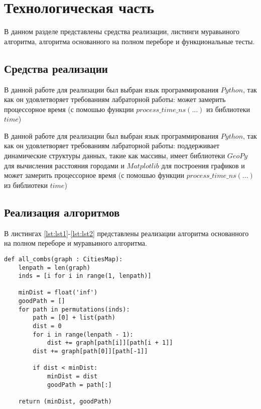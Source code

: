 \chapter{Технологическая часть}

В данном разделе представлены средства реализации, листинги муравьиного алгоритма, алгоритма основанного на полном переборе и функциональные тесты.

\section{Средства реализации}
В данной работе для реализации был выбран язык программирования $Python$\cite{python-city}, так как он удовлетворяет требованиям лабраторной работы: может замерить процессорное время (с помошью функции $process\_time\_ns(...)$ из библиотеки $time$\cite{python-time})

В данной работе для реализации был выбран язык программирования $Python$\cite{python-city}, так как он удовлетворяет требованиям лабраторной работы: поддерживает динамические структуры данных,
такие как массивы, имеет библиотеки $GeoPy$\cite{GeoPy} для вычисления расстояния городами и  $Matplotlib$\cite{matplotlib-lib} для построения графиков и может замерить процессорное время (с помошью функции $process\_time\_ns(...)$ из библиотеки $time$\cite{python-time})


\section{Реализация алгоритмов}
В листингах \ref{lst:lst1}-\ref{lst:lst2} представлены реализации алгоритма основанного на полном переборе и муравьиного алгоритма.

\begin{center}
	\captionsetup{justification=raggedright,singlelinecheck=off}
	\renewcommand{\lstlistingname}{Листинг}
	\begin{lstlisting}[label=lst:lst1,caption=Реализация алгоритма основанного на полном переборе]
def all_combs(graph : CitiesMap):
	lenpath = len(graph)
	inds = [i for i in range(1, lenpath)]
	
	minDist = float('inf')
	goodPath = []
	for path in permutations(inds):
		path = [0] + list(path)
		dist = 0
		for i in range(lenpath - 1):
			dist += graph[path[i]][path[i + 1]]
		dist += graph[path[0]][path[-1]]
		
		if dist < minDist:
			minDist = dist
			goodPath = path[:]
	
	return (minDist, goodPath)
	\end{lstlisting}
\end{center}

